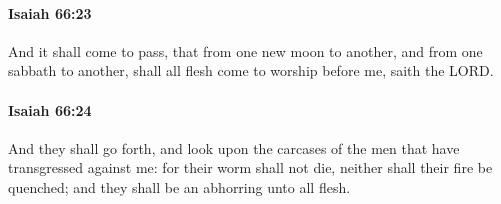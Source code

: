 		\paragraph{Isaiah 66:23} %
			\label{ISAIAH-66-23}

			And it shall come to pass, that from one new moon to another, and from one sabbath to another, shall all flesh come to worship before me, saith the LORD.


		\paragraph{Isaiah 66:24} %
			\label{ISAIAH-66-24}

			And they shall go forth, and look upon the carcases of the men that have transgressed against me: for their worm shall not die, neither shall their fire be quenched; and they shall be an abhorring unto all flesh.

